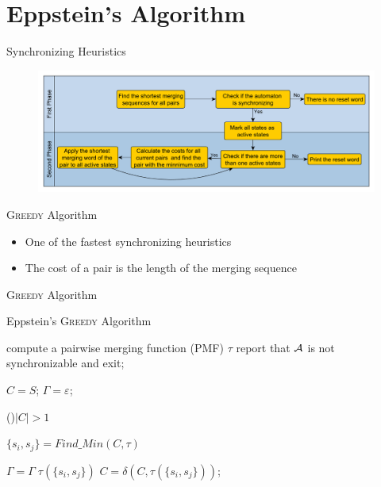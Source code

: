 \documentclass{beamer}
\begin{document}
\section{Eppstein's Algorithm}

\begin{frame}{Synchronizing Heuristics}
	\begin{figure}
		\includegraphics[width=\textwidth]{figs/heuristic_flow.pdf}
	\end{figure}
\end{frame}

\begin{frame}{\textsc{Greedy} Algorithm}
	\begin{itemize}
		\item One of the fastest synchronizing heuristics
		\item The cost of a pair is the length of the merging sequence
	\end{itemize}
\end{frame}

\begin{frame}{\textsc{Greedy} Algorithm}
	\small
	\begin{algorithm}[H]
	\caption{Eppstein's \textsc{Greedy} Algorithm}
	\label{algo:greedy}
	
	
	compute a pairwise merging function (PMF) $\tau$\;
	{
		report that ${\cal A}$ is not synchronizable and exit;	
	}

	
	$C = S$; 
	$\Gamma = \varepsilon$; 
	
	\While(){$|C| > 1$}
	{
		$\{ s_i,s_j \} = Find\_Min(C, \tau)$\;
		
		
		$\Gamma = \Gamma \; \tau(\{ s_i,s_j \})$\;
		$C = \delta(C,\tau(\{ s_i,s_j \}))$;
	}
	\end{algorithm}
\end{frame}
\end{document}
